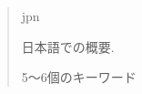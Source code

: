 \begin{abstract}
    \markboth{\abstractname}{}
\begin{scontents}[store-env=lang]
jpn
\end{scontents}
\begin{scontents}[store-env=abstracts,print-env=true]
日本語での概要.
\end{scontents}

\begin{scontents}[store-env=keywords,print-env=true]
5～6個のキーワード
\end{scontents}
\end{abstract}
\cleardoublepage
{}
